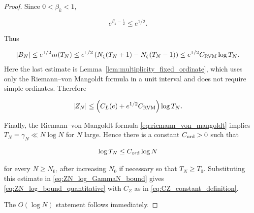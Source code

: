 \documentclass[11pt]{amsart}
\numberwithin{equation}{section}
\theoremstyle{plain}
\theoremstyle{definition}
\theoremstyle{remark}
\begin{document}
\begin{proof}
Since \(0<\beta_k<1\),

\begin{equation}
e^{\beta_k-\frac12}\le e^{1/2}.
\end{equation}

Thus

\begin{equation}
|B_N|
\le
e^{1/2}m(T_N)
 \le
e^{1/2}
\left(
N_\zeta(T_N+1)-N_\zeta(T_N-1)
\right)
\le
e^{1/2}C_{\rm RVM}\log T_N.
\end{equation}
Here the last estimate is Lemma~\ref{lem:multiplicity_fixed_ordinate},
which uses only the Riemann--von Mangoldt formula in a unit interval and
does not require simple ordinates.
Therefore

\begin{equation}
|Z_N|
\le
\left(C_L(e)+e^{1/2}C_{\rm RVM}\right)\log T_N.
\label{eq:ZN_log_GammaN_bound}
\end{equation}

Finally, the Riemann--von Mangoldt formula
\eqref{eq:riemann_von_mangoldt} implies \(T_N=\gamma_N\ll N\log N\) for
\(N\) large. Hence there is a constant \(C_{\rm ord}>0\) such that

\begin{equation}
\log T_N
\le
C_{\rm ord}\log N
\label{eq:ZN_log_TN_log_N_bound}
\end{equation}

for every \(N\ge N_0\), after increasing \(N_0\) if necessary so that
\(T_N\ge T_0\). Substituting this estimate in
\eqref{eq:ZN_log_GammaN_bound} gives
\eqref{eq:ZN_log_bound_quantitative} with \(C_Z\) as in
\eqref{eq:CZ_constant_definition}.

The \(O(\log N)\) statement follows immediately.
\end{proof}
\end{document}
